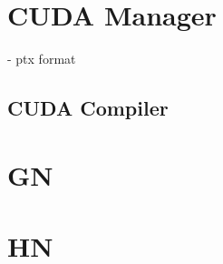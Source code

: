 \section{CUDA Manager}

- ptx format 

\subsection{CUDA Compiler} \label{Nvidia:CudaCompiler}


\section{GN}

\section{HN}